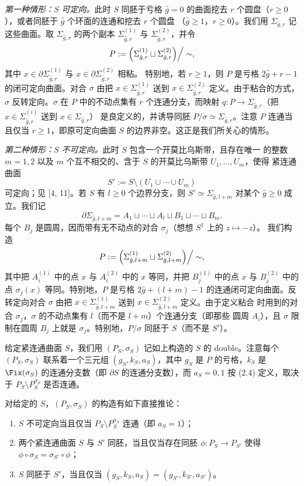 \medskip
\noindent\emph{第一种情形：$S$ 可定向。}此时 $S$ 同胚于亏格 $\hat g=0$ 的曲面挖去
$r$ 个圆盘（$r\ge0$），或者同胚于 $\hat g$ 个环面的连通和挖去 $r$ 个圆盘
（$\hat g\ge1$，$r\ge0$）。我们用 $\Sigma_{\hat g,r}$ 记这些曲面。取 $\Sigma_{\hat g,r}$
的两个副本 $\Sigma^{(1)}_{\hat g,r}$ 与 $\Sigma^{(2)}_{\hat g,r}$，并令
\[
P:=\Bigl(\Sigma^{(1)}_{\hat g,r}\sqcup\Sigma^{(2)}_{\hat g,r}\Bigr)\Big/\sim,
\]
其中 $x\in\partial\Sigma^{(1)}_{\hat g,r}$ 与 $x\in\partial\Sigma^{(2)}_{\hat g,r}$ 相粘。
特别地，若 $r\ge1$，则 $P$ 是亏格 $2\hat g+r-1$ 的闭可定向曲面。对合 $\sigma$ 由把
$x\in\Sigma^{(1)}_{\hat g,r}$ 送到 $x\in\Sigma^{(2)}_{\hat g,r}$ 定义。由于粘合的方式，
$\sigma$ 反转定向。$\sigma$ 在 $P$ 中的不动点集有 $r$ 个连通分支，而映射
$q:P\to\Sigma_{\hat g,r}$（把 $x\in\Sigma^{(i)}_{\hat g,r}$ 送到 $x\in\Sigma_{\hat g,r}$）
是良定义的，并诱导同胚 $P/\sigma\simeq\Sigma_{\hat g,r}$。注意 $P$ 连通当且仅当
$r\ge1$，即原可定向曲面 $S$ 的边界非空。这正是我们所关心的情形。

\medskip
\noindent\emph{第二种情形：$S$ 不可定向。}此时 $S$ 包含一个开莫比乌斯带，且存在唯一
的整数 $m=1,2$ 以及 $m$ 个互不相交的、含于 $S$ 的开莫比乌斯带 $U_1,\dots,U_m$，使得
紧连通曲面
\[
S':=S\setminus(U_1\cup\cdots\cup U_m)
\]
可定向；见 [4, 11]。若 $S$ 有 $l\ge0$ 个边界分支，则 $S'\simeq\Sigma_{\hat g,l+m}$
对某个 $\hat g\ge0$ 成立。我们记
\[
\partial\Sigma_{\hat g,l+m}=A_1\sqcup\cdots\sqcup A_l\sqcup B_1\sqcup\cdots\sqcup B_m .
\]
每个 $B_j$ 是圆周，因而带有无不动点的对合 $\sigma_j$（想想 $S^1$ 上的 $z\mapsto-z$）。
我们构造
\[
P:=\Bigl(\Sigma^{(1)}_{\hat g,l+m}\sqcup\Sigma^{(2)}_{\hat g,l+m}\Bigr)\Big/\sim,
\]
其中把 $A_i^{(1)}$ 中的点 $x$ 与 $A_i^{(2)}$ 中的 $x$ 等同，并把 $B_j^{(1)}$ 中的点
$x$ 与 $B_j^{(2)}$ 中的点 $\sigma_j(x)$ 等同。特别地，$P$ 是亏格
$2\hat g+(l+m)-1$ 的连通闭可定向曲面。反转定向对合 $\sigma$ 由把
$x\in\Sigma^{(1)}_{\hat g,l+m}$ 送到 $x\in\Sigma^{(2)}_{\hat g,l+m}$ 定义。由于定义粘合
时用到的对合 $\sigma_j$，$\sigma$ 的不动点集有 $l$（而不是 $l+m$）个连通分支（即那些
圆周 $A_i$），且 $\sigma$ 限制在圆周 $B_j$ 上就是 $\sigma_j$。特别地，$P/\sigma$ 同胚于
$S$（而不是 $S'$）。

\medskip
给定紧连通曲面 $S$，我们用 $(P_S,\sigma_S)$ 记如上构造的 $S$ 的 double。注意每个
$(P_S,\sigma_S)$ 联系着一个三元组 $(g_S,k_S,a_S)$，其中 $g_S$ 是 $P$ 的亏格，$k_S$ 是
$\Fix(\sigma_S)$ 的连通分支数（即 $\partial S$ 的连通分支数），而 $a_S=0,1$ 按 (2.4)
定义，取决于 $P_S\setminus P_S^{\sigma_S}$ 是否连通。

对给定的 $S$，$(P_S,\sigma_S)$ 的构造有如下直接推论：
\begin{enumerate}[label=(\roman*), leftmargin=2.2em, itemsep=0.15em]
\item $S$ 不可定向当且仅当 $P_S\setminus P_S^{\sigma_S}$ 连通（即 $a_S=1$）；
\item 两个紧连通曲面 $S$ 与 $S'$ 同胚，当且仅当存在同胚
      $\phi:P_S\to P_{S'}$ 使得 $\phi\circ\sigma_S=\sigma_{S'}\circ\phi$；
\item $S$ 同胚于 $S'$，当且仅当 $(g_S,k_S,a_S)=(g_{S'},k_{S'},a_{S'})$。
\end{enumerate}


